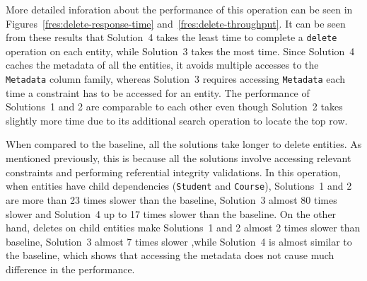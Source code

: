 





More detailed inforation about the performance of this operation can be seen in
Figures~\ref{fres:delete-response-time} and~\ref{fres:delete-throughput}.
It can be seen from these results that Solution~4 takes the least time to
complete a \texttt{delete} operation on each entity, while Solution~3 takes the
most time. Since Solution~4 caches the metadata of all the entities, it avoids
multiple accesses to the \texttt{Metadata} column family, whereas Solution~3
requires accessing \texttt{Metadata} each time a constraint has to be accessed
for an entity. The performance of Solutions~1 and 2 are comparable to each other
even though Solution~2 takes slightly more time due to its additional search
operation to locate the top row.



When compared to the baseline, all the solutions take longer to delete entities.
As mentioned previously, this is because all the solutions involve accessing
relevant constraints and performing referential integrity validations. In this
operation, when entities have child dependencies (\texttt{Student} and
\texttt{Course}), Solutions~1 and 2 are more than 23 times slower than the
baseline, Solution~3 almost 80 times slower and Solution~4   up to 17 times
slower than the baseline. On the other hand, deletes on child entities make
Solutions~1 and 2  almost 2 times slower than baseline, Solution~3  almost 7
times slower ,while Solution~4 is almost similar to the baseline, which shows
that accessing the metadata does not cause much difference in the performance.


